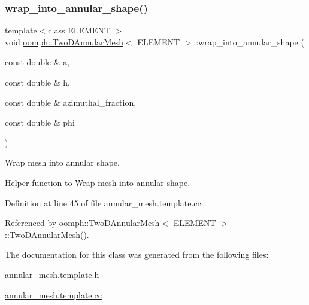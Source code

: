 \subsubsection{\texorpdfstring{wrap\+\_\+into\+\_\+annular\+\_\+shape()}{wrap\_into\_annular\_shape()}}
{\footnotesize\ttfamily template$<$class E\+L\+E\+M\+E\+NT $>$ \\
void \hyperlink{classoomph_1_1TwoDAnnularMesh}{oomph\+::\+Two\+D\+Annular\+Mesh}$<$ E\+L\+E\+M\+E\+NT $>$\+::wrap\+\_\+into\+\_\+annular\+\_\+shape (\begin{DoxyParamCaption}\item[{const double \&}]{a,  }\item[{const double \&}]{h,  }\item[{const double \&}]{azimuthal\+\_\+fraction,  }\item[{const double \&}]{phi }\end{DoxyParamCaption})\hspace{0.3cm}{\ttfamily [private]}}



Wrap mesh into annular shape. 

Helper function to Wrap mesh into annular shape. 

Definition at line 45 of file annular\+\_\+mesh.\+template.\+cc.



Referenced by oomph\+::\+Two\+D\+Annular\+Mesh$<$ E\+L\+E\+M\+E\+N\+T $>$\+::\+Two\+D\+Annular\+Mesh().



The documentation for this class was generated from the following files\+:\begin{DoxyCompactItemize}
\item 
\hyperlink{annular__mesh_8template_8h}{annular\+\_\+mesh.\+template.\+h}\item 
\hyperlink{annular__mesh_8template_8cc}{annular\+\_\+mesh.\+template.\+cc}\end{DoxyCompactItemize}

